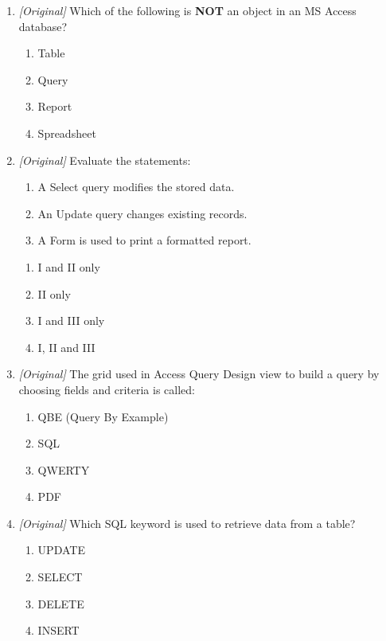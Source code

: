 \documentclass[11pt]{article}
\begin{document}
\begin{enumerate}[label=\textbf{Q\arabic*.}, leftmargin=*]
\begin{enumerate}[label=\Alph*.]
    \item choose a value from a list supplied by a table or query.
    \item create a new table automatically.
  \end{enumerate}
\item \textit{[Original]} Which of the following is \textbf{NOT} an object in
  an MS Access database?
  \begin{enumerate}[label=\Alph*.]
    \item Table
    \item Query
    \item Report
    \item Spreadsheet
  \end{enumerate}
\item \textit{[Original]} Evaluate the statements:
  \begin{enumerate}[label=\Roman*.]
    \item A Select query modifies the stored data.
    \item An Update query changes existing records.
    \item A Form is used to print a formatted report.
  \end{enumerate}
  \begin{enumerate}[label=\Alph*.]
    \item I and II only
    \item II only
    \item I and III only
    \item I, II and III
  \end{enumerate}
\item \textit{[Original]} The grid used in Access Query Design view to build
  a query by choosing fields and criteria is called:
  \begin{enumerate}[label=\Alph*.]
    \item QBE (Query By Example)
    \item SQL
    \item QWERTY
    \item PDF
  \end{enumerate}
\item \textit{[Original]} Which SQL keyword is used to retrieve data from a
  table?
  \begin{enumerate}[label=\Alph*.]
    \item UPDATE
    \item SELECT
    \item DELETE
    \item INSERT

\end{enumerate}
\end{enumerate}
\end{document}

